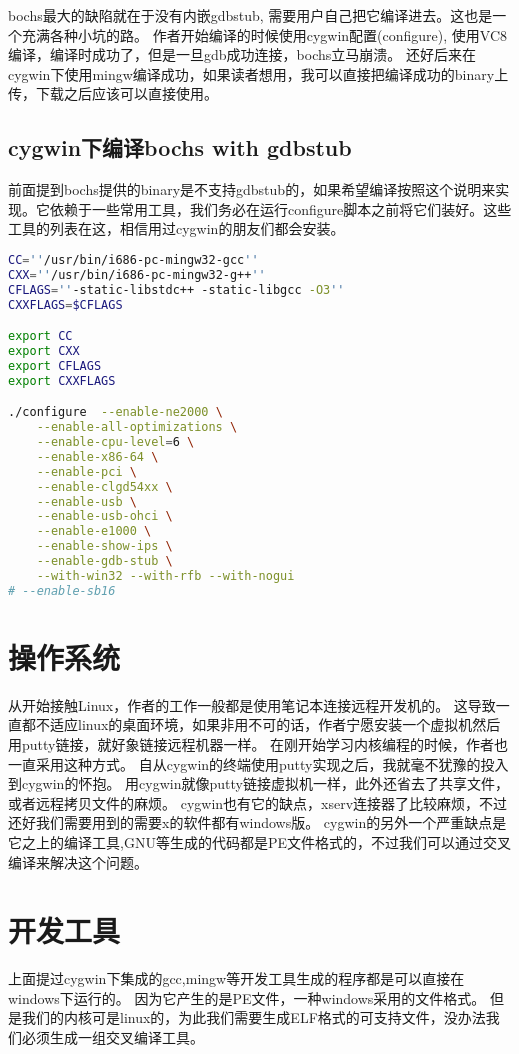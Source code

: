 bochs最大的缺陷就在于没有内嵌gdbstub, 需要用户自己把它编译进去。这也是一个充满各种小坑的路。
作者开始编译的时候使用cygwin配置(configure), 使用VC8编译，编译时成功了，但是一旦gdb成功连接，bochs立马崩溃。
还好后来在cygwin下使用mingw编译成功，如果读者想用，我可以直接把编译成功的binary上传，下载之后应该可以直接使用。

\subsection{cygwin下编译bochs with gdbstub}
前面提到bochs提供的binary是不支持gdbstub的，如果希望编译按照这个说明来实现。它依赖于一些常用工具，我们务必在运行configure脚本之前将它们装好。这些工具的列表在这，相信用过cygwin的朋友们都会安装。

\begin{lstlisting}[language=bash]
CC=''/usr/bin/i686-pc-mingw32-gcc''
CXX=''/usr/bin/i686-pc-mingw32-g++''
CFLAGS=''-static-libstdc++ -static-libgcc -O3''
CXXFLAGS=$CFLAGS

export CC
export CXX
export CFLAGS
export CXXFLAGS

./configure  --enable-ne2000 \
    --enable-all-optimizations \
    --enable-cpu-level=6 \
    --enable-x86-64 \
    --enable-pci \
    --enable-clgd54xx \
    --enable-usb \
    --enable-usb-ohci \
    --enable-e1000 \
    --enable-show-ips \
    --enable-gdb-stub \
    --with-win32 --with-rfb --with-nogui
# --enable-sb16
\end{lstlisting}
\section{操作系统}
从开始接触Linux，作者的工作一般都是使用笔记本连接远程开发机的。
这导致一直都不适应linux的桌面环境，如果非用不可的话，作者宁愿安装一个虚拟机然后用putty链接，就好象链接远程机器一样。
在刚开始学习内核编程的时候，作者也一直采用这种方式。
自从cygwin的终端使用putty实现之后，我就毫不犹豫的投入到cygwin的怀抱。
用cygwin就像putty链接虚拟机一样，此外还省去了共享文件，或者远程拷贝文件的麻烦。
cygwin也有它的缺点，xserv连接器了比较麻烦，不过还好我们需要用到的需要x的软件都有windows版。
cygwin的另外一个严重缺点是它之上的编译工具,GNU等生成的代码都是PE文件格式的，不过我们可以通过交叉编译来解决这个问题。
\section{开发工具}

上面提过cygwin下集成的gcc,mingw等开发工具生成的程序都是可以直接在windows下运行的。
因为它产生的是PE文件，一种windows采用的文件格式。
但是我们的内核可是linux的，为此我们需要生成ELF格式的可支持文件，没办法我们必须生成一组交叉编译工具。

